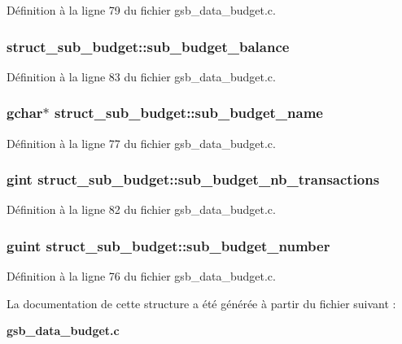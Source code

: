 Définition à la ligne 79 du fichier gsb\_\-data\_\-budget.c.

\subsubsection[{sub\_\-budget\_\-balance}]{ {\bf struct\_\-sub\_\-budget::sub\_\-budget\_\-balance}}\label{structstruct__sub__budget_a514cc676c26012f7271df2ff81cae9e9}


Définition à la ligne 83 du fichier gsb\_\-data\_\-budget.c.

\subsubsection[{sub\_\-budget\_\-name}]{\setlength{\rightskip}{0pt plus 5cm}gchar$\ast$ {\bf struct\_\-sub\_\-budget::sub\_\-budget\_\-name}}\label{structstruct__sub__budget_a6de98d64b624473266470fec380863e0}


Définition à la ligne 77 du fichier gsb\_\-data\_\-budget.c.

\subsubsection[{sub\_\-budget\_\-nb\_\-transactions}]{\setlength{\rightskip}{0pt plus 5cm}gint {\bf struct\_\-sub\_\-budget::sub\_\-budget\_\-nb\_\-transactions}}\label{structstruct__sub__budget_a7a87a0dc92758720cea79d7cd49103fd}


Définition à la ligne 82 du fichier gsb\_\-data\_\-budget.c.

\subsubsection[{sub\_\-budget\_\-number}]{\setlength{\rightskip}{0pt plus 5cm}guint {\bf struct\_\-sub\_\-budget::sub\_\-budget\_\-number}}\label{structstruct__sub__budget_a68b5cf25de67f9e0b78763ead8f884ca}


Définition à la ligne 76 du fichier gsb\_\-data\_\-budget.c.



La documentation de cette structure a été générée à partir du fichier suivant :\begin{DoxyCompactItemize}
\item 
{\bf gsb\_\-data\_\-budget.c}\end{DoxyCompactItemize}
